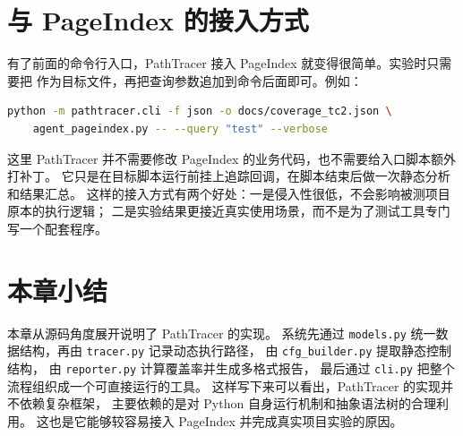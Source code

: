 \section{与 PageIndex 的接入方式}

有了前面的命令行入口，PathTracer 接入 PageIndex 就变得很简单。实验时只需要把  作为目标文件，再把查询参数追加到命令后面即可。例如：

\begin{lstlisting}[language=bash, caption={PathTracer 接入 PageIndex 的方式}]
python -m pathtracer.cli -f json -o docs/coverage_tc2.json \
    agent_pageindex.py -- --query "test" --verbose
\end{lstlisting}

这里 PathTracer 并不需要修改 PageIndex 的业务代码，也不需要给入口脚本额外打补丁。%
它只是在目标脚本运行前挂上追踪回调，在脚本结束后做一次静态分析和结果汇总。%
这样的接入方式有两个好处：一是侵入性很低，不会影响被测项目原本的执行逻辑；%
二是实验结果更接近真实使用场景，而不是为了测试工具专门写一个配套程序。

\section{本章小结}

本章从源码角度展开说明了 PathTracer 的实现。%
系统先通过 \texttt{models.py} 统一数据结构，再由 \texttt{tracer.py} 记录动态执行路径，%
由 \texttt{cfg\_builder.py} 提取静态控制结构，%
由 \texttt{reporter.py} 计算覆盖率并生成多格式报告，%
最后通过 \texttt{cli.py} 把整个流程组织成一个可直接运行的工具。%
这样写下来可以看出，PathTracer 的实现并不依赖复杂框架，%
主要依赖的是对 Python 自身运行机制和抽象语法树的合理利用。%
这也是它能够较容易接入 PageIndex 并完成真实项目实验的原因。
